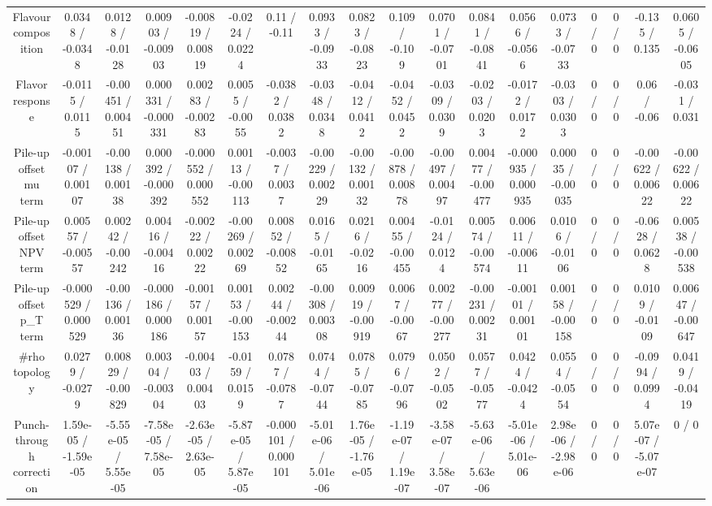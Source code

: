 \documentclass[10pt]{article}
\begin{document}
\begin{table}[htbp]
\begin{center}
\begin{tabular}{|c|c|c|c|c|c|c|c|c|c|c|c|c|c|c|c|c|c|}
  Flavour composition & 0.0348 / -0.0348 & 0.0128 / -0.0128 & 0.00903 / -0.00903 & -0.00819 / 0.00819 & -0.0224 / 0.0224 & 0.11 / -0.11 & 0.0933 / -0.0933 & 0.0823 / -0.0823 & 0.109 / -0.109 & 0.0701 / -0.0701 & 0.0841 / -0.0841 & 0.0566 / -0.0566 & 0.0733 / -0.0733 & 0 / 0 & 0 / 0 & -0.135 / 0.135 & 0.0605 / -0.0605 \\ 
  Flavor response & -0.0115 / 0.0115 & -0.00451 / 0.00451 & 0.000331 / -0.000331 & 0.00283 / -0.00283 & 0.0055 / -0.0055 & -0.0382 / 0.0382 & -0.0348 / 0.0348 & -0.0412 / 0.0412 & -0.0452 / 0.0452 & -0.0309 / 0.0309 & -0.0203 / 0.0203 & -0.0172 / 0.0172 & -0.0303 / 0.0303 & 0 / 0 & 0 / 0 & 0.06 / -0.06 & -0.031 / 0.031 \\ 
  Pile-up offset mu term & -0.00107 / 0.00107 & -0.00138 / 0.00138 & 0.000392 / -0.000392 & -0.000552 / 0.000552 & 0.00113 / -0.00113 & -0.0037 / 0.0037 & -0.00229 / 0.00229 & -0.00132 / 0.00132 & -0.00878 / 0.00878 & -0.00497 / 0.00497 & 0.00477 / -0.00477 & -0.000935 / 0.000935 & 0.00035 / -0.00035 & 0 / 0 & 0 / 0 & -0.00622 / 0.00622 & -0.00622 / 0.00622 \\ 
  Pile-up offset NPV term & 0.00557 / -0.00557 & 0.00242 / -0.00242 & 0.00416 / -0.00416 & -0.00222 / 0.00222 & -0.00269 / 0.00269 & 0.00852 / -0.00852 & 0.0165 / -0.0165 & 0.0216 / -0.0216 & 0.00455 / -0.00455 & -0.0124 / 0.0124 & 0.00574 / -0.00574 & 0.00611 / -0.00611 & 0.0106 / -0.0106 & 0 / 0 & 0 / 0 & -0.0628 / 0.0628 & 0.00538 / -0.00538 \\ 
  Pile-up offset p_{T} term & -0.000529 / 0.000529 & -0.00136 / 0.00136 & -0.000186 / 0.000186 & -0.00157 / 0.00157 & 0.00153 / -0.00153 & 0.00244 / -0.00244 & -0.00308 / 0.00308 & 0.00919 / -0.00919 & 0.0067 / -0.0067 & 0.00277 / -0.00277 & -0.00231 / 0.00231 & -0.00101 / 0.00101 & 0.00158 / -0.00158 & 0 / 0 & 0 / 0 & 0.0109 / -0.0109 & 0.00647 / -0.00647 \\ 
  #rho topology & 0.0279 / -0.0279 & 0.00829 / -0.00829 & 0.00304 / -0.00304 & -0.00403 / 0.00403 & -0.0159 / 0.0159 & 0.0787 / -0.0787 & 0.0744 / -0.0744 & 0.0785 / -0.0785 & 0.0796 / -0.0796 & 0.0502 / -0.0502 & 0.0577 / -0.0577 & 0.0424 / -0.0424 & 0.0554 / -0.0554 & 0 / 0 & 0 / 0 & -0.0994 / 0.0994 & 0.0419 / -0.0419 \\ 
  Punch-through correction & 1.59e-05 / -1.59e-05 & -5.55e-05 / 5.55e-05 & -7.58e-05 / 7.58e-05 & -2.63e-05 / 2.63e-05 & -5.87e-05 / 5.87e-05 & -0.000101 / 0.000101 & -5.01e-06 / 5.01e-06 & 1.76e-05 / -1.76e-05 & -1.19e-07 / 1.19e-07 & -3.58e-07 / 3.58e-07 & -5.63e-06 / 5.63e-06 & -5.01e-06 / 5.01e-06 & 2.98e-06 / -2.98e-06 & 0 / 0 & 0 / 0 & 5.07e-07 / -5.07e-07 & 0 / 0 \\ 

\end{tabular}
\end{center}
\end{table}
\end{document}
